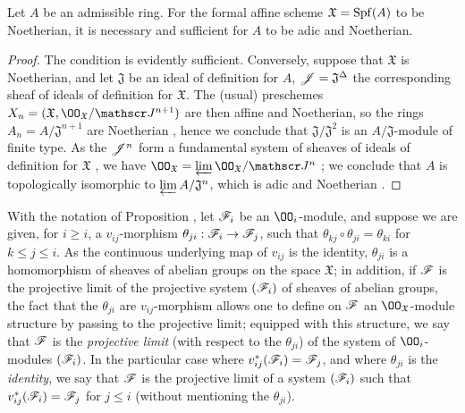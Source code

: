 \begin{cor}[10.6.5]
\label{1.10.6.5}
Let $A$ be an admissible ring.
For the formal affine scheme $\mathfrak{X}=\operatorname{Spf}(A)$ to be Noetherian, it is necessary and sufficient for $A$ to be adic and Noetherian.
\end{cor}

\begin{proof}
\label{proof-1.10.6.5}
The condition is evidently sufficient.
Conversely, suppose that $\mathfrak{X}$ is Noetherian, and let $\mathfrak{J}$ be an ideal of definition for $A$, $\mathscr{J}=\mathfrak{J}^\Delta$ the corresponding sheaf of ideals of definition for $\mathfrak{X}$.
The (usual) preschemes $X_n=(\mathfrak{X},\OO_\mathfrak{X}/\sh{J}^{n+1})$ are then affine and Noetherian, so the rings $A_n=A/\mathfrak{J}^{n+1}$ are Noetherian , hence we conclude that $\mathfrak{J}/\mathfrak{J}^2$ is an $A/\mathfrak{J}$-module of finite type.
As the $\mathscr{J}^n$ form a fundamental system of sheaves of ideals of definition for $\mathfrak{X}$ , we have $\OO_\mathfrak{X}=\varprojlim\OO_\mathfrak{X}/\sh{J}^n$ ; we conclude  that $A$ is topologically isomorphic to $\varprojlim A/\mathfrak{J}^n$, which is adic and Noetherian .
\end{proof}

\begin{rmk}[10.6.6]
\label{1.10.6.6}
With the notation of Proposition , let $\mathscr{F}_i$ be an $\OO_i$-module, and suppose we are given, for $i\geq i$, a $v_{ij}$-morphism $\theta_{ji}:\sh{F}_i\to\sh{F}_j$, such that $\theta_{kj}\circ\theta_{ji}=\theta_{ki}$ for $k\leq j\leq i$.
As the continuous underlying map of $v_{ij}$ is the identity, $\theta_{ji}$ is a homomorphism of sheaves of abelian groups on the space $\mathfrak{X}$; in addition, if $\mathscr{F}$ is the projective limit of the projective system $(\mathscr{F}_i)$ of sheaves of abelian groups, the fact that the $\theta_{ji}$ are $v_{ij}$-morphism allows one to define on $\mathscr{F}$ an $\OO_\mathfrak{X}$-module structure by passing to the projective limit; equipped with this structure, we say that $\mathscr{F}$ is the \emph{projective limit} (with respect to the $\theta_{ji}$) of the system of $\OO_i$-modules $(\mathscr{F}_i)$.
In the particular case where $v_{ij}^*(\mathscr{F}_i)=\mathscr{F}_j$, and where $\theta_{ji}$ is the \emph{identity}, we say that $\mathscr{F}$ is the projective limit of a system $(\mathscr{F}_i)$ such that $v_{ij}^*(\mathscr{F}_i)=\mathscr{F}_j$ for $j\leq i$ (without mentioning the $\theta_{ji}$).
\end{rmk}

